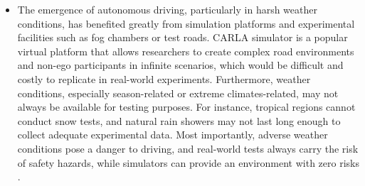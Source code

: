 \documentclass[rnd]{mas_proposal}
\begin{document}
\begin{itemize}
      \item The emergence of autonomous driving, particularly in harsh weather conditions, has benefited greatly from simulation platforms and experimental facilities such as fog chambers or test roads. CARLA simulator \cite{dosovitskiy2017carla} is a popular virtual platform that allows researchers to create complex road environments and non-ego participants in infinite scenarios, which would be difficult and costly to replicate in real-world experiments. Furthermore, weather conditions, especially season-related or extreme climates-related, may not always be available for testing purposes. For instance, tropical regions cannot conduct snow tests, and natural rain showers may not last long enough to collect adequate experimental data. Most importantly, adverse weather conditions pose a danger to driving, and real-world tests always carry the risk of safety hazards, while simulators can provide an environment with zero risks \cite{Zhang2021Dec}.


\end{itemize}
\end{document}
